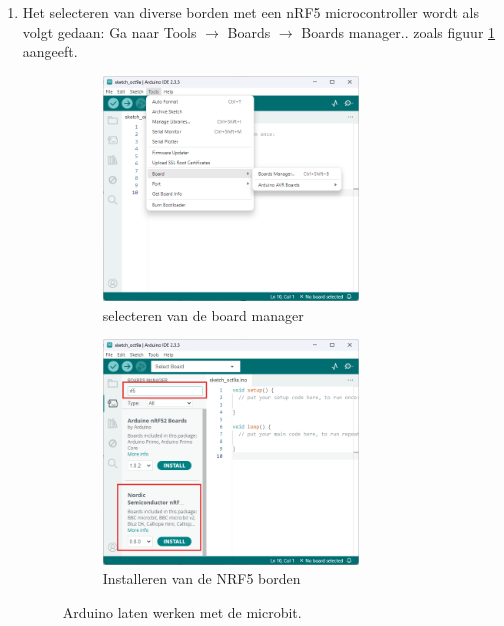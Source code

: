 \begin{enumerate}
   \item Het selecteren van diverse borden met een nRF5 microcontroller  wordt als volgt gedaan: Ga naar Tools $\rightarrow$ Boards $\rightarrow$ Boards manager.. zoals figuur \ref{fig:ardTool1} aangeeft.
\begin{figure}[h!]
	\centering
	\begin{center} 	
		\begin{subfigure}[b]{0.48\textwidth}
			\includegraphics[width=0.8\textwidth]{figuren/arduinoTools}
			\caption{selecteren van de board manager }
			\label{fig:ardTool1}
			
		\end{subfigure}
		\begin{subfigure}[b]{0.48\textwidth}
			\includegraphics[width=0.8\textwidth]{figuren/arduinoTools2}
			\caption{Installeren van de NRF5 borden }
			\label{fig:ardTool2}
		\end{subfigure}
		\captionsetup{justification=centering}
		\caption{Arduino laten werken met de microbit. }
		\label{fig:ardTool}
	\end{center}
	

\end{figure}
\end{enumerate}

